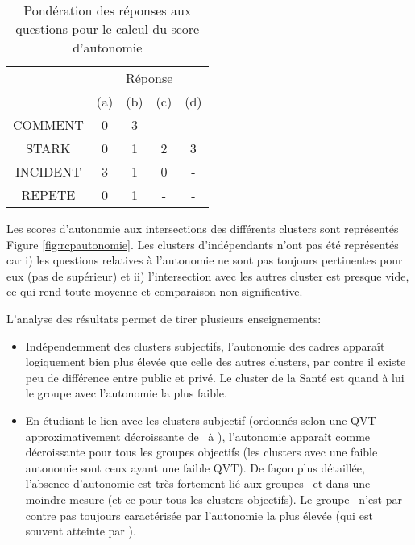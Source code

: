 \documentclass[11pt,fleqn,a4paper,openany,frenchb]{book} %
\begin{document}
\bgroup
\def\arraystretch{1.5}
\begin{table}[!h]
\centering
\begin{tabular}{|c|c|c|c|c|}
\cline{2-5}
\multicolumn{1}{c}{}&\multicolumn{4}{|c|}{Réponse}\\ \cline{2-5}
\multicolumn{1}{c}{} & \multicolumn{1}{|c}{(a)} & \multicolumn{1}{|c}{(b)} & \multicolumn{1}{|c}{(c)}  & \multicolumn{1}{|c|}{(d)} \\ \hline
COMMENT & 0 & 3 & - & - \\ 
\hline 
STARK & 0 & 1 & 2 & 3 \\
\hline
INCIDENT & 3 & 1 & 0 & - \\ 
\hline 
REPETE & 0 & 1 & - & - \\
\hline

\end{tabular}
\caption{Pondération des réponses aux questions pour le calcul du score d'autonomie}

\label{tab:autonomiescore}
\end{table}
\bgroup
\def\arraystretch{1}

Les scores d'autonomie aux intersections des différents clusters sont représentés Figure \ref{fig:rcpautonomie}. Les clusters d'indépendants n'ont pas été représentés car i) les questions relatives à l'autonomie ne sont pas toujours pertinentes pour eux (pas de supérieur) et ii) l'intersection avec les autres cluster est presque vide, ce qui rend toute moyenne et comparaison non significative.

L'analyse des résultats permet de tirer plusieurs enseignements:
    \begin{itemize}
    \item Indépendemment des clusters subjectifs, l'autonomie des cadres apparaît logiquement bien plus élevée que celle des autres clusters, par contre il existe peu de différence entre public et privé. Le cluster de la Santé est quand à lui le groupe avec l'autonomie la plus faible.
    \item En étudiant le lien avec les clusters subjectif (ordonnés selon une QVT approximativement décroissante de \HEUR\ à \MALH ), l'autonomie apparaît comme décroissante pour tous les groupes objectifs (les clusters avec une faible autonomie sont ceux ayant une faible QVT). De façon plus détaillée, l'absence d'autonomie est très fortement lié aux groupes \MALH\ et dans une moindre mesure \ENV (et ce pour tous les clusters objectifs). Le groupe \HEUR\ n'est par contre pas toujours caractérisée par l'autonomie la plus élevée (qui est souvent atteinte par \RAS ).  
    \end{itemize}
\end{document}
